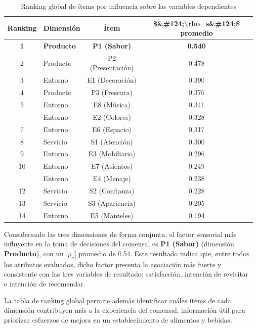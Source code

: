 \documentclass[
  spanish,
]{article}
\begin{document}
\begin{longtable}[t]{clcc}
\caption{\label{tab:tabla-ranking-global}Ranking global de ítems por influencia sobre las variables dependientes}\\
\toprule
Ranking & Dimensión & Ítem & \$\&\#124;\textbackslash{}rho\_s\&\#124;\$ promedio\\
\midrule
\textbf{1} & \textbf{Producto} & \textbf{P1 (Sabor)} & \textbf{0.540}\\
2 & Producto & P2 (Presentación) & 0.478\\
3 & Entorno & E1 (Decoración) & 0.390\\
4 & Producto & P3 (Frescura) & 0.376\\
5 & Entorno & E8 (Música) & 0.341\\
\addlinespace
6 & Entorno & E2 (Colores) & 0.328\\
7 & Entorno & E6 (Espacio) & 0.317\\
8 & Servicio & S1 (Atención) & 0.300\\
9 & Entorno & E3 (Mobiliario) & 0.296\\
10 & Entorno & E7 (Asientos) & 0.249\\
\addlinespace
11 & Entorno & E4 (Menaje) & 0.238\\
12 & Servicio & S2 (Confianza) & 0.228\\
13 & Servicio & S3 (Apariencia) & 0.205\\
14 & Entorno & E5 (Manteles) & 0.194\\
\bottomrule
\end{longtable}

Considerando las tres dimensiones de forma conjunta, el factor sensorial
más influyente en la toma de decisiones del comensal es \textbf{P1
(Sabor)} (dimensión \textbf{Producto}), con un \(|\rho_s|\) promedio de
0.54. Este resultado indica que, entre todos los atributos evaluados,
dicho factor presenta la asociación más fuerte y consistente con las
tres variables de resultado: satisfacción, intención de revisitar e
intención de recomendar.

La tabla de ranking global permite además identificar cuáles ítems de
cada dimensión contribuyen más a la experiencia del comensal,
información útil para priorizar esfuerzos de mejora en un
establecimiento de alimentos y bebidas.
\end{document}
